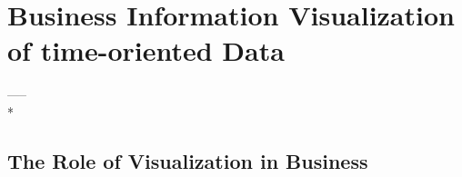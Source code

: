\chapter{Business Information Visualization of time-oriented Data}
\label{chap:BIV of BigData}

----- \\*
\section{The Role of Visualization in Business}

